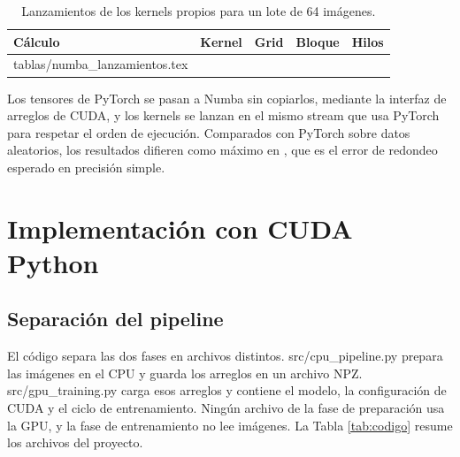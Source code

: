 \documentclass[11pt,letterpaper]{article}
\makeatletter
\newcommand{\filastabla}[1]{\@@input #1 }
\makeatother
\begin{document}
\begin{table}[H]
\centering
\small
\caption{Lanzamientos de los kernels propios para un lote de 64 imágenes.}
\label{tab:numba}
\begin{tabular}{L{4.6cm}lccr}
\toprule
Cálculo & Kernel & Grid & Bloque & Hilos \\
\midrule
\filastabla{tablas/numba_lanzamientos.tex}
\bottomrule
\end{tabular}
\end{table}

Los tensores de PyTorch se pasan a Numba sin copiarlos, mediante la interfaz de arreglos de CUDA, y los kernels se lanzan en el mismo stream que usa PyTorch para respetar el orden de ejecución. Comparados con PyTorch sobre datos aleatorios, los resultados difieren como máximo en $$, que es el error de redondeo esperado en precisión simple.

\section{Implementación con CUDA Python}

\subsection{Separación del pipeline}
El código separa las dos fases en archivos distintos. src/cpu\_pipeline.py prepara las imágenes en el CPU y guarda los arreglos en un archivo NPZ. src/gpu\_training.py carga esos arreglos y contiene el modelo, la configuración de CUDA y el ciclo de entrenamiento. Ningún archivo de la fase de preparación usa la GPU, y la fase de entrenamiento no lee imágenes. La Tabla \ref{tab:codigo} resume los archivos del proyecto.
\end{document}
